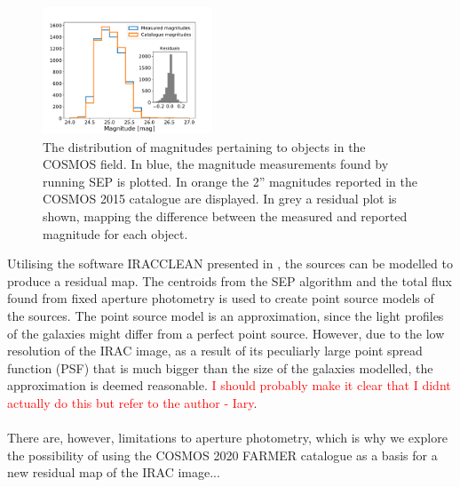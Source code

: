 \begin{figure}
    \centering %
    \includegraphics[trim={0.5cm 0 2cm 1.8cm},clip,width=0.45\textwidth]{Code/Saved_Figures/Mag_hist.pdf}
    \caption{The distribution of magnitudes pertaining to objects in the COSMOS field. In blue, the magnitude measurements found by running SEP is plotted. In orange the 2'' magnitudes reported in the COSMOS 2015 catalogue are displayed. In grey a residual plot is shown, mapping the difference between the measured and reported magnitude for each object.}
    \label{mag_hist}  
\end{figure}

Utilising the software IRACCLEAN presented in \cite{Hsieh_2012_IRACCLEAN}, the sources can be modelled to produce a residual map. The centroids from the SEP algorithm and the total flux found from fixed aperture photometry is used to create point source models of the sources. The point source model is an approximation, since the light profiles of the galaxies might differ from a perfect point source. However, due to the low resolution of the IRAC image, as a result of its peculiarly large point spread function (PSF) that is much bigger than the size of the galaxies modelled, the approximation is deemed reasonable. \textcolor{red}{I should probably make it clear that I didnt actually do this but refer to the author - Iary}. \\ \\
There are, however, limitations to aperture photometry, which is why we explore the possibility of using the COSMOS 2020 FARMER catalogue as a basis for a new residual map of the IRAC image...




